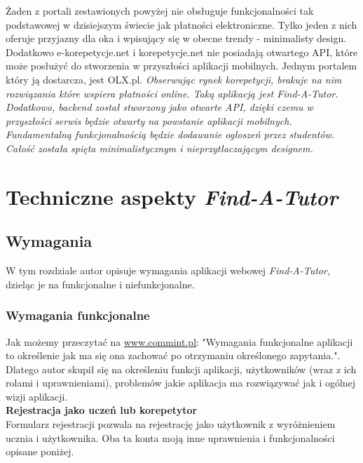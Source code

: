 \documentclass[12pt]{article}
\numberwithin{figure}{section}
\begin{document}
Żaden z portali zestawionych powyżej nie obsługuje funkcjonalności tak podstawowej w dzisiejszym świecie jak płatności elektroniczne. Tylko jeden z nich oferuje przyjazny dla oka i wpisujący się w obecne trendy - minimalisty design. Dodatkowo e-korepetycje.net i korepetycje.net nie posiadają otwartego API, które może posłużyć do stworzenia w przyszłości aplikacji mobilnych. Jednym portalem który ją dostarcza, jest OLX.pl.
\newline
\newline
\textit{Obserwując rynek korepetycji, brakuje na nim rozwiązania które wspiera płatności online. Taką aplikacją jest Find-A-Tutor. Dodatkowo, backend został stworzony jako otwarte API, dzięki czemu w przyszłości serwis będzie otwarty na powstanie aplikacji mobilnych. Fundamentalną funkcjonalnością będzie dodawanie ogłoszeń przez studentów. Całość została spięta minimalistycznym i nieprzytłaczającym designem.}

\section{Techniczne aspekty \textit{Find-A-Tutor}}

\subsection{Wymagania}
W tym rozdziale autor opisuje wymagania aplikacji webowej \textit{Find-A-Tutor}, dzieląc je na funkcjonalne i niefunkcjonalne. 

\subsubsection{Wymagania funkcjonalne}
    Jak możemy przeczytać na \url{www.commint.pl}: "Wymagania funkcjonalne aplikacji to określenie jak ma się ona zachować po otrzymaniu określonego zapytania."\cite{funkcjonalne}. Dlatego autor skupił się na określeniu funkcji aplikacji, użytkowników (wraz z ich rolami i uprawnieniami), problemów jakie aplikacja ma rozwiązywać jak i ogólnej wizji aplikacji.\\
    \noindent
    \textbf{Rejestracja jako uczeń lub korepetytor}\\
    \indent
    Formularz rejestracji pozwala na rejestrację jako użytkownik z wyróżnieniem ucznia i użytkownika. Oba ta konta moją inne uprawnienia i funkcjonalności opisane poniżej.
            
\end{document}

